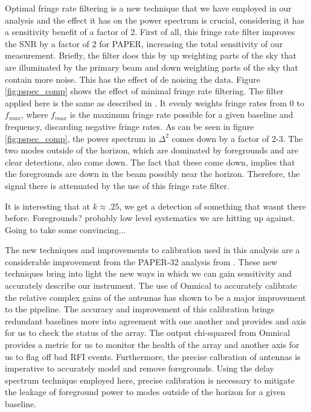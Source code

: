 \documentclass[twocolumn,numberedappendix]{emulateapj} \shorttitle{PSA64}
\begin{document}
Optimal fringe rate filtering is a new technique that we have employed in our
analysis and the effect it has on the power spectrum is crucial, considering it
has a sensitivity benefit of a factor of 2. First of all, this fringe rate
filter improves the SNR by a factor of 2 for PAPER, increasing the total
sensitivity of our measurement. Briefly, the filter does this by up weighting
parts of the sky that are illuminated by the primary beam and down weighting
parts of the sky that contain more noise. This has the effect of de noising the
data. Figure \ref{fig:pspec_comp} shows the effect of minimal fringe rate
filtering. The filter applied here is the same as described in
\cite{parsons_et_al2014}. It evenly weights fringe rates from 0 to $f_{max}$,
where $f_{max}$ is the maximum fringe rate possible for a given baseline and
frequency, discarding negative fringe rates. As can be seen in figure
\ref{fig:pspec_comp}, the power spectrum in $\Delta^{2}$ comes down by a factor of
2-3. The two modes outside of the horizon, which are dominated by foregrounds
and are clear detections, also come down. The fact that these come down, implies
that the foregrounds are down in the beam possibly near the horizon. Therefore,
the signal there is attenuated by the use of this fringe rate filter. 

It is interesting that at $k\approx.25$, we get a detection of something that
wasnt there before. Foregrounds? probably low level systematics we are hitting
up against. Going to take some convincing...

The new techniques and improvements to calibration used in this analysis are a
considerable improvement from the PAPER-32 analysis from
\cite{parsons_et_al2014}. These new techniques bring into light the new ways in
which we can gain sensitivity and accurately describe our instrument. The use of
Omnical to accurately calibrate the relative complex gains of the antennas has
shown to be a major improvement to the pipeline. The accuracy and improvement of
this calibration brings redundant baselines more into agreement with one another
and provides and axis for us to check the status of the array. The output 
chi-squared from Omnical provides a metric for us to monitor the health of the
array and another axis for us to flag off bad RFI events. Furthermore, the
precise calbration of antennas is imperative to accurately model and remove
foregrounds. Using the delay spectrum technique employed here, precise
calibration is necessary to mitigate the leakage of foreground power to modes
outside of the horizon for a given baseline. 
\end{document}
